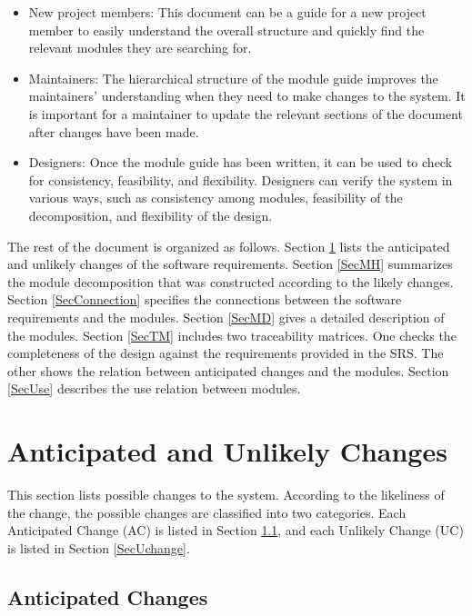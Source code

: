 \documentclass[12pt, titlepage]{article}
\begin{document}
\begin{itemize}
\item New project members: This document can be a guide for a new
  project member to easily understand the overall structure and
  quickly find the relevant modules they are searching for.
\item Maintainers: The hierarchical structure of the module guide
  improves the maintainers' understanding when they need to make
  changes to the system. It is important for a maintainer to update
  the relevant sections of the document after changes have been made.
\item Designers: Once the module guide has been written, it can be
  used to check for consistency, feasibility, and flexibility. Designers can 
  verify the system in various ways, such as consistency among modules, 
  feasibility of the decomposition, and flexibility of the design.
\end{itemize}

The rest of the document is organized as follows. Section
\ref{SecChange} lists the anticipated and unlikely changes of the
software requirements. Section \ref{SecMH} summarizes the module
decomposition that was constructed according to the likely
changes. Section \ref{SecConnection} specifies the connections between
the software requirements and the modules. Section \ref{SecMD} gives a
detailed description of the modules. Section \ref{SecTM} includes two
traceability matrices. One checks the completeness of the design
against the requirements provided in the SRS. The other shows the
relation between anticipated changes and the modules. Section
\ref{SecUse} describes the use relation between modules.

\section{Anticipated and Unlikely Changes} \label{SecChange}

\hspace{3ex}This section lists possible changes to the
system. According to the likeliness of the change, the possible
changes are classified into two categories. Each Anticipated Change (AC) is
listed in Section \ref{SecAchange}, and each Unlikely Change (UC) is listed in
Section \ref{SecUchange}.

\subsection{Anticipated Changes} \label{SecAchange}
\end{document}

